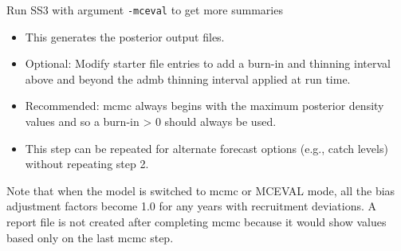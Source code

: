 \noindent Run SS3 with argument \texttt{-mceval} to get more summaries
\begin{itemize}
	\item This generates the posterior output files.
	\item Optional: Modify starter file entries to add a burn-in and thinning interval above and beyond the \gls{admb} thinning interval applied at run time.
	\item Recommended: \gls{mcmc} always begins with the maximum posterior density values and so a burn-in > 0 should always be used.
	\item This step can be repeated for alternate forecast options (e.g., catch levels) without repeating step 2.
\end{itemize}

Note that when the model is switched to \gls{mcmc} or MCEVAL mode, all the bias adjustment factors become 1.0 for any years with recruitment deviations. A report file is not created after completing \gls{mcmc} because it would show values based only on the last \gls{mcmc} step.

\pagebreak
